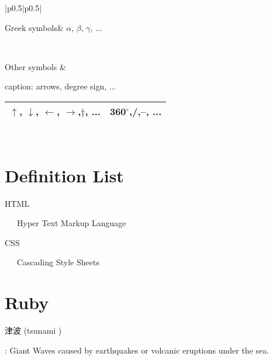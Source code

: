 \documentclass[pdflatex, a4paper, 10pt, jadriver=standard]{bxjsarticle}
\begin{document}
\begin{tabular}{|p{}|p{}|}\hline

		
			Greek symbols&
			$\alpha$, $\beta$, $\gamma$, ...
		
\\\hline

			Other symbols
			&

caption: arrows, degree sign, ...\newline
\begin{tabular}{|p{}|p{}|}\hline

				
				
					$\uparrow$, $\downarrow$, $\leftarrow$, $\rightarrow$,$\dagger$, ...
					&
360$^\circ$,/,--, ...
			
\\\hline
\end{tabular}

        
\\\hline
	\end{tabular}
\newline

	

\section*{\Large Definition List}

  HTML\par

  ~~~Hyper Text Markup Language
  \par

CSS
  \par

~~~Cascading Style Sheets\par
  

\section*{\Large Ruby}

    
        津波
        (tsunami
)
    

    : Giant Waves caused by earthquakes or volcanic eruptions under the sea. 

    
\end{document}
